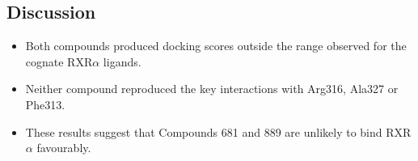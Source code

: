 \subsection*{Discussion}


\begin{itemize}
    \item Both compounds produced docking scores outside the range observed for the cognate RXR$\alpha$ ligands.

    \item Neither compound reproduced the key interactions with Arg316, Ala327 or Phe313.

    \item These results suggest that Compounds 681 and 889 are unlikely to bind RXR$\alpha$ favourably.
\end{itemize}

